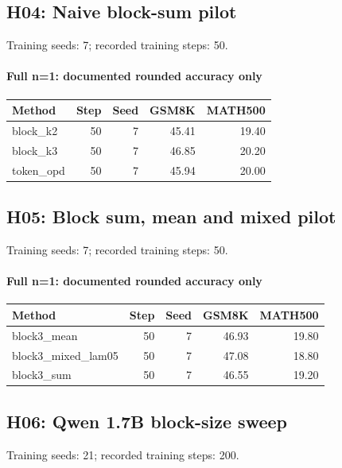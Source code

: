 \subsection{H04: Naive block-sum pilot}
\label{history:early_blocksum50}
Training seeds: 7; recorded training steps: 50.
\paragraph{Full n=1: documented rounded accuracy only}
{\footnotesize\setlength{\tabcolsep}{3.5pt}
\begin{longtable}{@{}p{1.4in}rrrr@{}}
\toprule
Method & Step & Seed & GSM8K & MATH500 \\
\midrule\endhead
block\_\allowbreak{}k2 & 50 & 7 & 45.41 & 19.40 \\
block\_\allowbreak{}k3 & 50 & 7 & 46.85 & 20.20 \\
token\_\allowbreak{}opd & 50 & 7 & 45.94 & 20.00 \\
\bottomrule\end{longtable}
}
\subsection{H05: Block sum, mean and mixed pilot}
\label{history:early_blockadv50}
Training seeds: 7; recorded training steps: 50.
\paragraph{Full n=1: documented rounded accuracy only}
{\footnotesize\setlength{\tabcolsep}{3.5pt}
\begin{longtable}{@{}p{1.4in}rrrr@{}}
\toprule
Method & Step & Seed & GSM8K & MATH500 \\
\midrule\endhead
block3\_\allowbreak{}mean & 50 & 7 & 46.93 & 19.80 \\
block3\_\allowbreak{}mixed\_\allowbreak{}lam05 & 50 & 7 & 47.08 & 18.80 \\
block3\_\allowbreak{}sum & 50 & 7 & 46.55 & 19.20 \\
\bottomrule\end{longtable}
}
\subsection{H06: Qwen 1.7B block-size sweep}
\label{history:qwen17_sweep}
Training seeds: 21; recorded training steps: 200.
